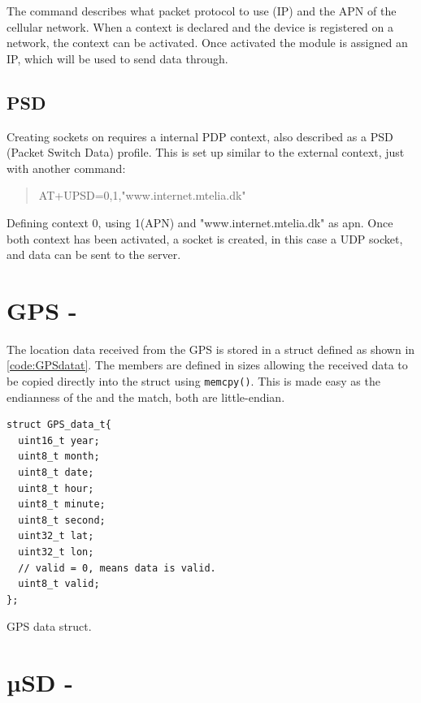 The command describes what packet protocol to use (IP) and the APN of the cellular network.
When a context is declared and the device is registered on a network, the context can be activated.
Once activated the module is assigned an IP, which will be used to send data through.

\subsection{PSD}
Creating sockets on \SARA requires a internal PDP context, also described as a PSD (Packet Switch Data) profile.
This is set up similar to the external context, just with another command:
\begin{quote}
	AT+UPSD=0,1,"www.internet.mtelia.dk"
\end{quote}
Defining context 0, using 1(APN) and "www.internet.mtelia.dk" as apn. Once both context has been activated, a socket is created, in this case a UDP socket, and data can be sent to the server.

\section{GPS - \GPS}
\label{sec:impl:gps}
The location data received from the \GPS GPS is stored in a struct defined as shown in \cref{code:GPSdatat}.
The members are defined in sizes allowing the received data to be copied directly into the struct using \texttt{memcpy()}.
This is made easy as the endianness of the \GPS and the \SAMD match, both are little-endian.

\begin{listing}
	\begin{verbatim}
struct GPS_data_t{
  uint16_t year;
  uint8_t month;
  uint8_t date;
  uint8_t hour;
  uint8_t minute;
  uint8_t second;
  uint32_t lat;
  uint32_t lon;
  // valid = 0, means data is valid.
  uint8_t valid;
};
	\end{verbatim}
	\caption{GPS data struct.}
	\label{code:GPSdatat}
\end{listing}

\section{µSD - \SDsock}


\FloatBarrier